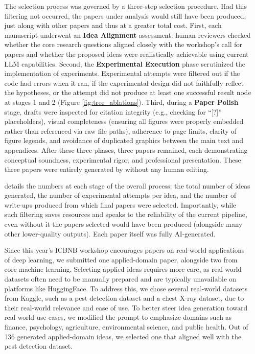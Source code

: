 \begin{appendices}
The selection process was governed by a three‐step selection procedure. Had this filtering not occurred, the papers under analysis would still have been produced, just along with other papers and thus at a greater total cost.
First, each manuscript underwent an \textbf{Idea Alignment} assessment: human reviewers checked whether the core research questions aligned closely with the workshop’s call for papers and whether the proposed ideas were realistically achievable using current LLM capabilities.
Second, the \textbf{Experimental Execution} phase scrutinized the implementation of experiments. Experimental attempts were filtered out if the code had errors when it ran, if the experimental design did not faithfully reflect the hypotheses, or the attempt did not produce at least one successful result node at stages 1 and 2 (Figure \ref{fig:tree_ablations}).
Third, during a \textbf{Paper Polish} stage, drafts were inspected for citation integrity (e.g., checking for ``[?]'' placeholders), visual completeness (ensuring all figures were properly embedded rather than referenced via raw file paths), adherence to page limits, clarity of figure legends, and avoidance of duplicated graphics between the main text and appendices. After these three phases, three papers remained, each demonstrating conceptual soundness, experimental rigor, and professional presentation. These three papers were entirely generated by \ouralgo without any human editing.

 details the numbers at each stage of the overall process: the total number of ideas generated, the number of experimental attempts per idea, and the number of write-ups produced from which final papers were selected. Importantly, while such filtering saves resources and speaks to the reliability of the current pipeline, even without it the papers selected would have been produced (alongside many other lower-quality outputs). Each paper itself was fully AI-generated.

Since this year's ICBNB workshop encourages papers on real-world applications of deep learning, we submitted one applied-domain paper, alongside two from core machine learning. Selecting applied ideas requires more care, as real-world datasets often need to be manually prepared and are typically unavailable on platforms like HuggingFace. To address this, we chose several real-world datasets from Kaggle, such as a pest detection dataset and a chest X-ray dataset, due to their real-world relevance and ease of use. To better steer idea generation toward real-world use cases, we modified the prompt to emphasize domains such as finance, psychology, agriculture, environmental science, and public health. Out of 136 generated applied-domain ideas, we selected one that aligned well with the pest detection dataset.



\end{appendices}
